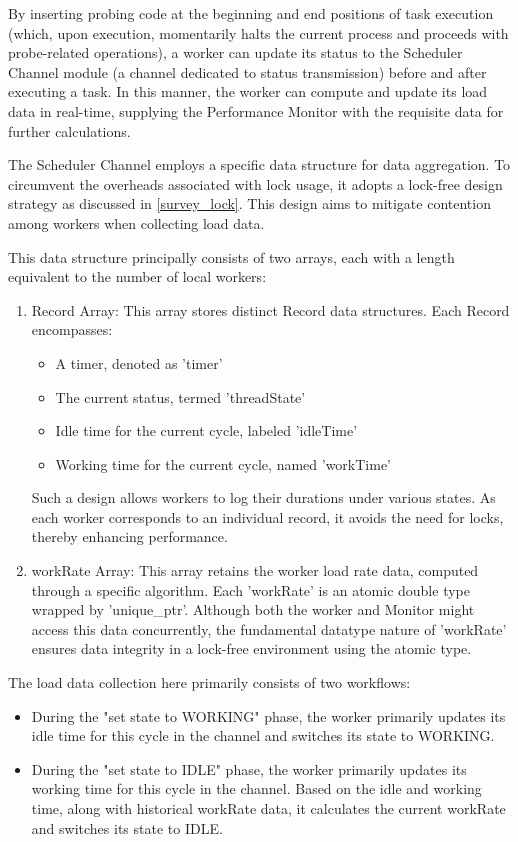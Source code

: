 \documentclass{mproj}
\begin{document}
By inserting probing code at the beginning and end positions of task execution
(which, upon execution, momentarily halts the current process and proceeds with probe-related operations),
a worker can update its status to the Scheduler Channel module (a channel dedicated to status transmission)
before and after executing a task.
In this manner, the worker can compute and update its load data in real-time,
supplying the Performance Monitor with the requisite data for further calculations.

The Scheduler Channel employs a specific data structure for data aggregation.
To circumvent the overheads associated with lock usage,
it adopts a lock-free design strategy as discussed in \cref{survey_lock}.
This design aims to mitigate contention among workers when collecting load data.

This data structure principally consists of two arrays, each with a length equivalent to the number of local workers:
\begin{enumerate}
    \item Record Array: This array stores distinct Record data structures. Each Record encompasses:
          \begin{itemize}
              \item A timer, denoted as 'timer'
              \item The current status, termed 'threadState'
              \item Idle time for the current cycle, labeled 'idleTime'
              \item Working time for the current cycle, named 'workTime'
          \end{itemize}
          Such a design allows workers to log their durations under various states.
          As each worker corresponds to an individual record,
          it avoids the need for locks, thereby enhancing performance.
    \item workRate Array: This array retains the worker load rate data, computed through a specific algorithm.
          Each 'workRate' is an atomic double type wrapped by 'unique\_ptr'.
          Although both the worker and Monitor might access this data concurrently,
          the fundamental datatype nature of 'workRate' ensures data integrity in a lock-free environment using the atomic type.
\end{enumerate}

The load data collection here primarily consists of two workflows:
\begin{itemize}
    \item During the "set state to WORKING" phase,
          the worker primarily updates its idle time for this cycle in the channel and switches its state to WORKING.
    \item During the "set state to IDLE" phase,
          the worker primarily updates its working time for this cycle in the channel.
          Based on the idle and working time, along with historical workRate data,
          it calculates the current workRate and switches its state to IDLE.
\end{itemize}
\end{document}
